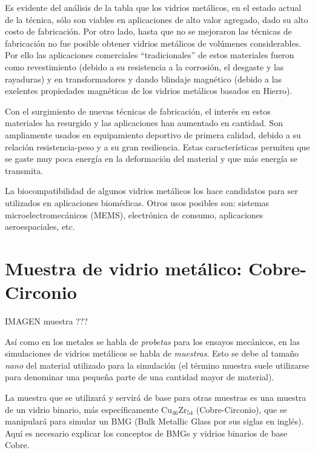 Es evidente del análisis de la tabla que los vidrios metálicos, en el estado actual de la técnica, sólo son viables en aplicaciones de alto valor agregado, dado su alto costo de fabricación. Por otro lado, hasta que no se mejoraron las técnicas de fabricación no fue posible obtener vidrios metálicos de volúmenes considerables. Por ello las aplicaciones comerciales ``tradicionales'' de estos materiales fueron como revestimiento (debido a su resistencia a la corrosión, el desgaste y las rayaduras) y en transformadores y dando blindaje magnético (debido a las exelentes propiedades magnéticas de los vidrios metálicos basados en Hierro).

Con el surgimiento de nuevas técnicas de fabricación, el interés en estos materiales ha resurgido y las aplicaciones han aumentado en cantidad. Son ampliamente usados en equipamiento deportivo de primera calidad, debido a su relación resistencia-peso y a su gran resiliencia. Estas características permiten que se gaste muy poca energía en la deformación del material y que más energía se transmita.

La biocompatibilidad de algunos vidrios metálicos los hace candidatos para ser utilizados en aplicaciones biomédicas. Otros usos posibles son: sistemas microelectromecánicos (MEMS), electrónica de consumo, aplicaciones aeroespaciales, etc.


\section{Muestra de vidrio metálico: Cobre-Circonio}
\label{S1_4}

IMAGEN muestra ???

Así como en los metales se habla de \textit{probetas} para los ensayos mecánicos, en las simulaciones de vidrios metálicos se habla de \textit{muestras}. Esto se debe al tamaño \textit{nano} del material utilizado para la simulación (el término muestra suele utilizarse para denominar una pequeña parte de una cantidad mayor de material).

La muestra que se utilizará y servirá de base para otras muestras es una muestra de un vidrio binario, más específicamente Cu$_{46}$Zr$_{54}$ (Cobre-Circonio), que se manipulará para simular un BMG (Bulk Metallic Glass por sus siglas en inglés). Aquí es necesario explicar los conceptos de BMGs y vidrios binarios de base Cobre.

